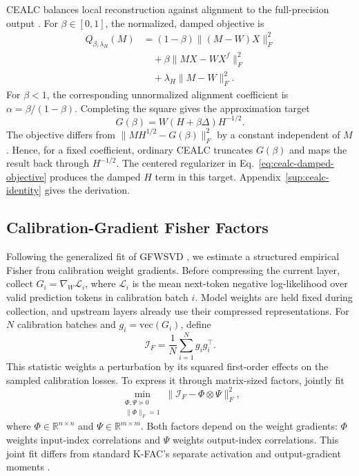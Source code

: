 \documentclass[11pt]{article}
\begin{document}
CEALC balances local reconstruction against alignment to the full-precision output \citep{hu2026saessvd}. For $\beta\in[0,1]$, the normalized, damped objective is
\begin{equation}
\begin{aligned}
Q_{\beta,\lambda_H}(M)
&=(1-\beta)\|(M-W)X\|_F^2\\
&\quad+\beta\|MX-WX^f\|_F^2\\
&\quad+\lambda_H\|M-W\|_F^2.
\end{aligned}
\label{eq:cealc-damped-objective}
\end{equation}
For $\beta<1$, the corresponding unnormalized alignment coefficient is $\alpha=\beta/(1-\beta)$. Completing the square gives the approximation target
\begin{equation}
G(\beta)=W(H+\beta\Delta)H^{-1/2}.
\label{eq:cealc-target}
\end{equation}
The objective differs from $\|MH^{1/2}-G(\beta)\|_F^2$ by a constant independent of $M$. Hence, for a fixed coefficient, ordinary CEALC truncates $G(\beta)$ and maps the result back through $H^{-1/2}$. The centered regularizer in Eq.~\eqref{eq:cealc-damped-objective} produces the damped $H$ term in this target. Appendix~\ref{sup:cealc-identity} gives the derivation.

\subsection{Calibration-Gradient Fisher Factors}\label{sec:fisher}

Following the generalized fit of GFWSVD \citep{chekalina2025gfwsvd}, we estimate a structured empirical Fisher from calibration weight gradients. Before compressing the current layer, collect $G_i=\nabla_W\mathcal L_i$, where $\mathcal L_i$ is the mean next-token negative log-likelihood over valid prediction tokens in calibration batch $i$. Model weights are held fixed during collection, and upstream layers already use their compressed representations. For $N$ calibration batches and $g_i=\mathrm{vec}(G_i)$, define
\begin{equation}
\mathcal I_F=\frac1N\sum_{i=1}^{N}g_i g_i^\top.
\label{eq:empirical-fisher}
\end{equation}
This statistic weights a perturbation by its squared first-order effects on the sampled calibration losses. To express it through matrix-sized factors, jointly fit
\begin{equation}
\min_{\substack{\Phi,\Psi\succeq0\\\|\Phi\|_F=1}}
\|\mathcal I_F-\Phi\otimes\Psi\|_F^2,
\label{eq:fisher-kron-fit}
\end{equation}
where $\Phi\in\mathbb R^{n\times n}$ and $\Psi\in\mathbb R^{m\times m}$. Both factors depend on the weight gradients: $\Phi$ weights input-index correlations and $\Psi$ weights output-index correlations. This joint fit differs from standard K-FAC's separate activation and output-gradient moments \citep{grosse2016kfac}.
\end{document}
